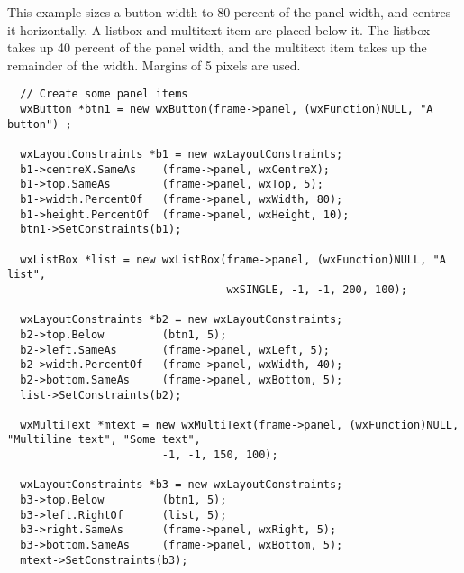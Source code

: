 This example sizes a button width to 80 percent of the panel width, and centres
it horizontally. A listbox and multitext item are placed below it. The listbox
takes up 40 percent of the panel width, and the multitext item takes up
the remainder of the width. Margins of 5 pixels are used.

\begin{verbatim}
  // Create some panel items
  wxButton *btn1 = new wxButton(frame->panel, (wxFunction)NULL, "A button") ;

  wxLayoutConstraints *b1 = new wxLayoutConstraints;
  b1->centreX.SameAs    (frame->panel, wxCentreX);
  b1->top.SameAs        (frame->panel, wxTop, 5);
  b1->width.PercentOf   (frame->panel, wxWidth, 80);
  b1->height.PercentOf  (frame->panel, wxHeight, 10);
  btn1->SetConstraints(b1);

  wxListBox *list = new wxListBox(frame->panel, (wxFunction)NULL, "A list",
                                  wxSINGLE, -1, -1, 200, 100);

  wxLayoutConstraints *b2 = new wxLayoutConstraints;
  b2->top.Below         (btn1, 5);
  b2->left.SameAs       (frame->panel, wxLeft, 5);
  b2->width.PercentOf   (frame->panel, wxWidth, 40);
  b2->bottom.SameAs     (frame->panel, wxBottom, 5);
  list->SetConstraints(b2);

  wxMultiText *mtext = new wxMultiText(frame->panel, (wxFunction)NULL, "Multiline text", "Some text",
                        -1, -1, 150, 100);
  
  wxLayoutConstraints *b3 = new wxLayoutConstraints;
  b3->top.Below         (btn1, 5);
  b3->left.RightOf      (list, 5);
  b3->right.SameAs      (frame->panel, wxRight, 5);
  b3->bottom.SameAs     (frame->panel, wxBottom, 5);
  mtext->SetConstraints(b3);
\end{verbatim}


